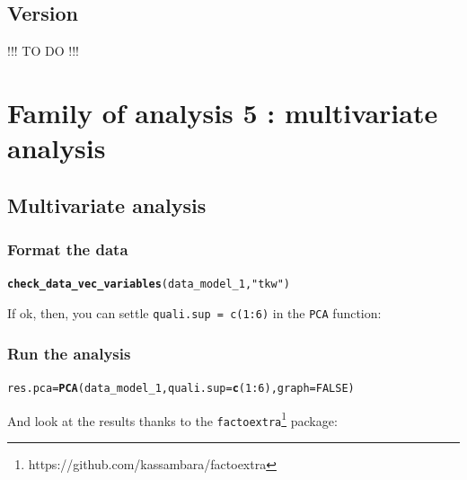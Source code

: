 \documentclass{book}\usepackage[]{graphicx}\usepackage[]{color}
\makeatletter
\newcommand{\hlnum}[1]{\textcolor[rgb]{0.686,0.059,0.569}{#1}}%
\newcommand{\hlstr}[1]{\textcolor[rgb]{0.192,0.494,0.8}{#1}}%
\newcommand{\hlopt}[1]{\textcolor[rgb]{0,0,0}{#1}}%
\newcommand{\hlstd}[1]{\textcolor[rgb]{0.345,0.345,0.345}{#1}}%
\newcommand{\hlkwb}[1]{\textcolor[rgb]{0.69,0.353,0.396}{#1}}%
\newcommand{\hlkwc}[1]{\textcolor[rgb]{0.333,0.667,0.333}{#1}}%
\newcommand{\hlkwd}[1]{\textcolor[rgb]{0.737,0.353,0.396}{\textbf{#1}}}%
\newenvironment{kframe}{%
 \def\at@end@of@kframe{}%
 \ifinner\ifhmode%
  \def\at@end@of@kframe{\end{minipage}}%
  \begin{minipage}{\columnwidth}%
 \fi\fi%
 \def\FrameCommand##1{\hskip\@totalleftmargin \hskip-\fboxsep
 \colorbox{shadecolor}{##1}\hskip-\fboxsep
     \hskip-\linewidth \hskip-\@totalleftmargin \hskip\columnwidth}%
 \MakeFramed {\advance\hsize-\width
   \@totalleftmargin\z@ \linewidth\hsize
   \@setminipage}}%
 {\par\unskip\endMakeFramed%
 \at@end@of@kframe}
\newenvironment{knitrout}{}{} %
\makeatother
\begin{document}
\subsection{Version}
\label{version}


!!! TO DO !!!
\newpage

\section{Family of analysis 5 : multivariate analysis}
\label{section_analysis5}


\subsection{Multivariate analysis}
\label{multivariate_analysis}

\subsubsection{Format the data}

\begin{knitrout}
\color{fgcolor}\begin{kframe}
\begin{alltt}
\hlkwd{check_data_vec_variables}\hlstd{(data_model_1,} \hlstr{"tkw"}\hlstd{)}
\end{alltt}
\end{kframe}
\end{knitrout}

If ok, then, you can settle \texttt{quali.sup = c(1:6)} in the \texttt{PCA} function:

\subsubsection{Run the analysis}


\begin{knitrout}
\color{fgcolor}\begin{kframe}
\begin{alltt}
\hlstd{res.pca} \hlkwb{=} \hlkwd{PCA}\hlstd{(data_model_1,} \hlkwc{quali.sup} \hlstd{=} \hlkwd{c}\hlstd{(}\hlnum{1}\hlopt{:}\hlnum{6}\hlstd{),} \hlkwc{graph} \hlstd{=} \hlnum{FALSE}\hlstd{)}
\end{alltt}
\end{kframe}
\end{knitrout}

And look at the results thanks to the \texttt{factoextra}\footnote{https://github.com/kassambara/factoextra} package:
\end{document}
